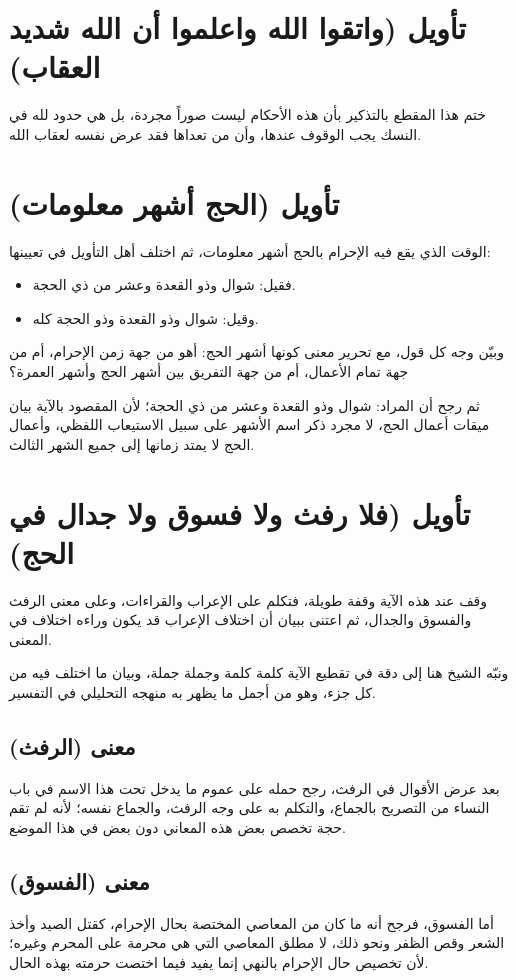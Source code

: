\section{تأويل (واتقوا الله واعلموا أن الله شديد العقاب)}
ختم  هذا المقطع بالتذكير بأن هذه الأحكام ليست صوراً مجردة، بل هي حدود لله في النسك يجب الوقوف عندها، وأن من تعداها فقد عرض نفسه لعقاب الله.

\separator

\section{تأويل (الحج أشهر معلومات)}
 الوقت الذي يقع فيه الإحرام بالحج أشهر معلومات، ثم اختلف أهل التأويل في تعيينها:
\begin{itemize}
    \item فقيل: شوال وذو القعدة وعشر من ذي الحجة.
    \item وقيل: شوال وذو القعدة وذو الحجة كله.
\end{itemize}

وبيّن  وجه كل قول، مع تحرير معنى كونها أشهر الحج: أهو من جهة زمن الإحرام، أم من جهة تمام الأعمال، أم من جهة التفريق بين أشهر الحج وأشهر العمرة؟

ثم رجح أن المراد: شوال وذو القعدة وعشر من ذي الحجة؛ لأن المقصود بالآية بيان ميقات أعمال الحج، لا مجرد ذكر اسم الأشهر على سبيل الاستيعاب اللفظي، وأعمال الحج لا يمتد زمانها إلى جميع الشهر الثالث.

\section{تأويل (فلا رفث ولا فسوق ولا جدال في الحج)}
وقف  عند هذه الآية وقفة طويلة، فتكلم على الإعراب والقراءات، وعلى معنى الرفث والفسوق والجدال، ثم اعتنى ببيان أن اختلاف الإعراب قد يكون وراءه اختلاف في المعنى.

ونبّه الشيخ هنا إلى دقة  في تقطيع الآية كلمة كلمة وجملة جملة، وبيان ما اختلف فيه من كل جزء، وهو من أجمل ما يظهر به منهجه التحليلي في التفسير.

\subsection{معنى (الرفث)}
بعد عرض الأقوال في الرفث، رجح  حمله على عموم ما يدخل تحت هذا الاسم في باب النساء من التصريح بالجماع، والتكلم به على وجه الرفث، والجماع نفسه؛ لأنه لم تقم حجة تخصص بعض هذه المعاني دون بعض في هذا الموضع.

\subsection{معنى (الفسوق)}
أما الفسوق، فرجح  أنه ما كان من المعاصي المختصة بحال الإحرام، كقتل الصيد وأخذ الشعر وقص الظفر ونحو ذلك، لا مطلق المعاصي التي هي محرمة على المحرم وغيره؛ لأن تخصيص حال الإحرام بالنهي إنما يفيد فيما اختصت حرمته بهذه الحال.

